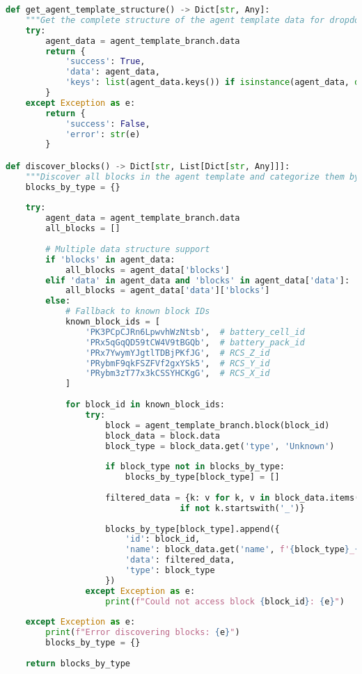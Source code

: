 \documentclass[12pt,a4paper]{article}
\begin{document}
\begin{lstlisting}[language=Python, caption=Template Structure Management]
def get_agent_template_structure() -> Dict[str, Any]:
    """Get the complete structure of the agent template data for dropdown exploration"""
    try:
        agent_data = agent_template_branch.data
        return {
            'success': True,
            'data': agent_data,
            'keys': list(agent_data.keys()) if isinstance(agent_data, dict) else []
        }
    except Exception as e:
        return {
            'success': False,
            'error': str(e)
        }

def discover_blocks() -> Dict[str, List[Dict[str, Any]]]:
    """Discover all blocks in the agent template and categorize them by type"""
    blocks_by_type = {}
    
    try:
        agent_data = agent_template_branch.data
        all_blocks = []
        
        # Multiple data structure support
        if 'blocks' in agent_data:
            all_blocks = agent_data['blocks']
        elif 'data' in agent_data and 'blocks' in agent_data['data']:
            all_blocks = agent_data['data']['blocks']
        else:
            # Fallback to known block IDs
            known_block_ids = [
                'PK3PCpCJRn6LpwvhWzNtsb',  # battery_cell_id
                'PRx5qGqQD59tCW4V9tBGQb',  # battery_pack_id
                'PRx7YwymYJgtlTDBjPKfJG',  # RCS_Z_id
                'PRybmF9qkFSZFVf2gxYSk5',  # RCS_Y_id
                'PRybm3zT77x3kCSSYHCKgG',  # RCS_X_id
            ]
            
            for block_id in known_block_ids:
                try:
                    block = agent_template_branch.block(block_id)
                    block_data = block.data
                    block_type = block_data.get('type', 'Unknown')
                    
                    if block_type not in blocks_by_type:
                        blocks_by_type[block_type] = []
                    
                    filtered_data = {k: v for k, v in block_data.items() 
                                   if not k.startswith('_')}
                    
                    blocks_by_type[block_type].append({
                        'id': block_id,
                        'name': block_data.get('name', f'{block_type}_{block_id}'),
                        'data': filtered_data,
                        'type': block_type
                    })
                except Exception as e:
                    print(f"Could not access block {block_id}: {e}")
    
    except Exception as e:
        print(f"Error discovering blocks: {e}")
        blocks_by_type = {}
    
    return blocks_by_type
\end{lstlisting}
\end{document}
